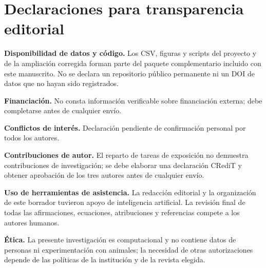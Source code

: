 \documentclass[11pt,letterpaper]{article}
\begin{document}
\section*{Declaraciones para transparencia editorial}
\textbf{Disponibilidad de datos y código.} Los CSV, figuras y scripts del proyecto y de la ampliación corregida forman parte del paquete complementario incluido con este manuscrito. No se declara un repositorio público permanente ni un DOI de datos que no hayan sido registrados.

\textbf{Financiación.} No consta información verificable sobre financiación externa; debe completarse antes de cualquier envío.

\textbf{Conflictos de interés.} Declaración pendiente de confirmación personal por todos los autores.

\textbf{Contribuciones de autor.} El reparto de tareas de exposición no demuestra contribuciones de investigación; se debe elaborar una declaración CRediT y obtener aprobación de los tres autores antes de cualquier envío.

\textbf{Uso de herramientas de asistencia.} La redacción editorial y la organización de este borrador tuvieron apoyo de inteligencia artificial. La revisión final de todas las afirmaciones, ecuaciones, atribuciones y referencias compete a los autores humanos.

\textbf{Ética.} La presente investigación es computacional y no contiene datos de personas ni experimentación con animales; la necesidad de otras autorizaciones depende de las políticas de la institución y de la revista elegida.
\end{document}
